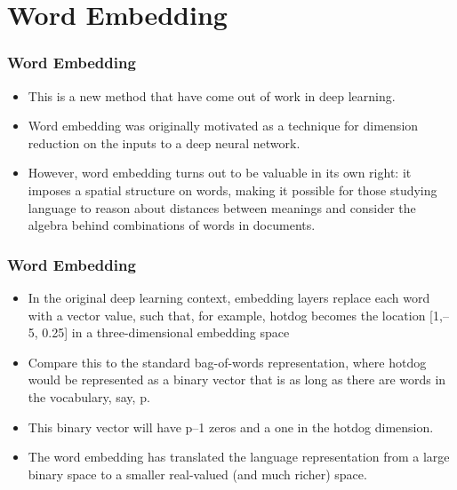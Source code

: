 \documentclass[
  shownotes,
  xcolor={svgnames},
  hyperref={colorlinks,citecolor=DarkBlue,linkcolor=DarkRed,urlcolor=DarkBlue}
  , aspectratio=169]{beamer}
\begin{document}
\section{Word Embedding }
\begin{frame}
\frametitle{Word Embedding }

\begin{itemize}
\item This is a new method  that have come out of work in deep learning. 
\medskip
\item Word embedding was originally motivated as a technique for dimension reduction on the inputs to a deep neural network. 
\medskip
\medskip
\item However, word embedding turns out to be valuable in its own right: it imposes a spatial structure on words, making it possible for those studying language to reason about distances between meanings and consider the algebra behind combinations of words in documents. 


\end{itemize}




\end{frame}
\begin{frame}
\frametitle{Word Embedding }

\begin{itemize}
  \item In the original deep learning context, embedding layers replace each word with a vector value, such that, for example, hotdog becomes the location [1,–5, 0.25] in a three-dimensional embedding space%
  \item Compare this to the standard bag-of-words representation, where hotdog would be represented as a binary vector that is as long as there are words in the vocabulary, say, p. 
  \medskip
  \item This binary vector will have p–1 zeros and a one in the hotdog dimension. 
  \medskip
  \item The word embedding has translated the language representation from a large binary space to a smaller real-valued (and much richer) space. 
\end{itemize}


\end{frame}
\end{document}
